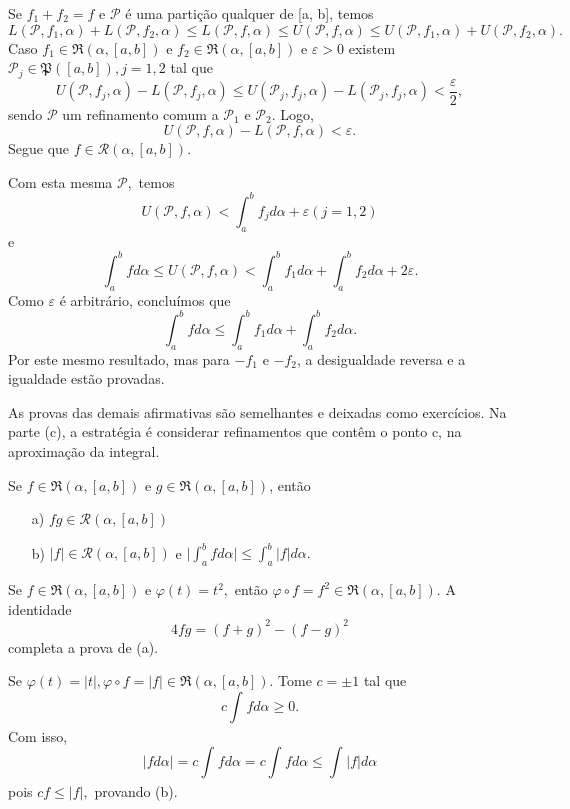 \documentclass[analysis_notes.tex]{subfiles}
\begin{document}
\begin{proof*}
	Se \(f_1 + f_2 = f\) e \(\mathcal{P}\) é uma partição qualquer de [a, b], temos
	\[
		L(\mathcal{P}, f_1, \alpha ) + L(\mathcal{P}, f_2, \alpha )\leq L(\mathcal{P}, f, \alpha ) \leq U(\mathcal{P}, f, \alpha ) \leq U(\mathcal{P}, f_1, \alpha ) + U(\mathcal{P}, f_2, \alpha ).
	\]
	Caso \(f_1\in \mathfrak{R}(\alpha , [a,b])\) e \(f_2\in \mathfrak{R}(\alpha , [a,b])\) e \(\varepsilon > 0\) existem \(\mathcal{P}_{j}\in \mathfrak{P}([a, b]), j = 1, 2\) tal que
	\[
		U(\mathcal{P}, f_{j}, \alpha ) - L(\mathcal{P}, f_{j}, \alpha )\leq U(\mathcal{P}_{j}, f_{j}, \alpha ) - L(\mathcal{P}_{j}, f_{j}, \alpha ) < \frac{\varepsilon }{2},
	\]
	sendo \(\mathcal{P}\) um refinamento comum a \(\mathcal{P}_1\) e \(\mathcal{P}_2\). Logo,
	\[
		U(\mathcal{P}, f, \alpha ) - L(\mathcal{P}, f, \alpha ) < \varepsilon .
	\]
	Segue que \(f\in \mathcal{R}(\alpha , [a, b])\).

	Com esta mesma \(\mathcal{P},\) temos
	\[
		U(\mathcal{P}, f, \alpha ) < \int_{a}^{b} f_{j}d\alpha +\varepsilon (j = 1, 2)
	\]
	e
	\[
		\int_{a}^{b}fd\alpha \leq U(\mathcal{P}, f, \alpha ) < \int_{a}^{b} f_1d\alpha + \int_{a}^{b}f_2d\alpha + 2\varepsilon .
	\]
	Como \(\varepsilon \) é arbitrário, concluímos que
	\[
		\int_{a}^{b}fd\alpha \leq \int_{a}^{b}f_1d\alpha +\int_{a}^{b}f_2d\alpha .
	\]
	Por este mesmo resultado, mas para \(-f_1\) e \(-f_2\), a desigualdade reversa e a igualdade estão provadas.

	As provas das demais afirmativas são semelhantes e deixadas como exercícios. Na parte (c), a estratégia é considerar
	refinamentos que contêm o ponto c, na aproximação da integral. \qedsymbol
\end{proof*}
\begin{theorem*}
	Se \(f\in \mathfrak{R}(\alpha , [a, b])\) e \(g\in \mathfrak{R}(\alpha , [a, b])\), então
	\begin{itemize}
		\item[a)] \(fg\in \mathcal{R}(\alpha , [a,b])\)
		\item[b)] \(|f|\in \mathcal{R}(\alpha , [a,b])\) e \(\biggl\vert \int_{a}^{b}fd\alpha  \biggr\vert\leq \int_{a}^{b}|f|d\alpha .\)
	\end{itemize}
\end{theorem*}
\begin{proof*}
	Se \(f\in \mathfrak{R}(\alpha , [a,b])\) e \(\varphi (t) = t^{2},\) então \(\varphi \circ f = f^{2}\in \mathfrak{R}(\alpha , [a,b])\). A identidade
	\[
		4fg = (f+g)^{2} - (f-g)^{2}
	\]
	completa a prova de (a).

	Se \(\varphi (t) = |t|, \varphi \circ f = |f|\in \mathfrak{R}(\alpha , [a,b])\). Tome \(c = \pm 1\) tal que
	\[
		c \int_{}^{}fd\alpha \geq 0.
	\]
	Com isso,
	\[
		\biggl\vert fd\alpha  \biggr\vert = c \int_{}^{}fd\alpha = c \int_{}^{}fd\alpha \leq \int_{}^{}|f|d\alpha
	\]
	pois \(cf\leq |f|,\) provando (b). \qedsymbol
\end{proof*}
\end{document}
